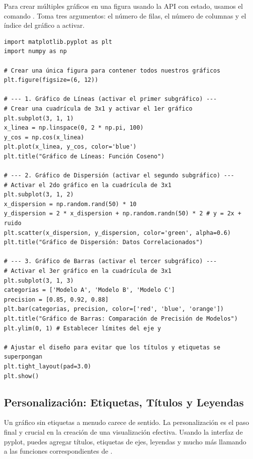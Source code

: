 \begin{example}
Para crear múltiples gráficos en una figura usando la API con estado, usamos el comando . Toma tres argumentos: el número de filas, el número de columnas y el índice del gráfico a activar.
\text{ }\begin{verbatim}
import matplotlib.pyplot as plt
import numpy as np

# Crear una única figura para contener todos nuestros gráficos
plt.figure(figsize=(6, 12))

# --- 1. Gráfico de Líneas (activar el primer subgráfico) ---
# Crear una cuadrícula de 3x1 y activar el 1er gráfico
plt.subplot(3, 1, 1)
x_linea = np.linspace(0, 2 * np.pi, 100)
y_cos = np.cos(x_linea)
plt.plot(x_linea, y_cos, color='blue')
plt.title("Gráfico de Líneas: Función Coseno")

# --- 2. Gráfico de Dispersión (activar el segundo subgráfico) ---
# Activar el 2do gráfico en la cuadrícula de 3x1
plt.subplot(3, 1, 2)
x_dispersion = np.random.rand(50) * 10
y_dispersion = 2 * x_dispersion + np.random.randn(50) * 2 # y = 2x + ruido
plt.scatter(x_dispersion, y_dispersion, color='green', alpha=0.6)
plt.title("Gráfico de Dispersión: Datos Correlacionados")

# --- 3. Gráfico de Barras (activar el tercer subgráfico) ---
# Activar el 3er gráfico en la cuadrícula de 3x1
plt.subplot(3, 1, 3)
categorias = ['Modelo A', 'Modelo B', 'Modelo C']
precision = [0.85, 0.92, 0.88]
plt.bar(categorias, precision, color=['red', 'blue', 'orange'])
plt.title("Gráfico de Barras: Comparación de Precisión de Modelos")
plt.ylim(0, 1) # Establecer límites del eje y

# Ajustar el diseño para evitar que los títulos y etiquetas se superpongan
plt.tight_layout(pad=3.0)
plt.show()
\end{verbatim}
\end{example}

\subsection{Personalización: Etiquetas, Títulos y Leyendas}
\label{subsec:plot_customization}
Un gráfico sin etiquetas a menudo carece de sentido. La personalización es el paso final y crucial en la creación de una visualización efectiva. Usando la interfaz de pyplot, puedes agregar títulos, etiquetas de ejes, leyendas y mucho más llamando a las funciones correspondientes de .


